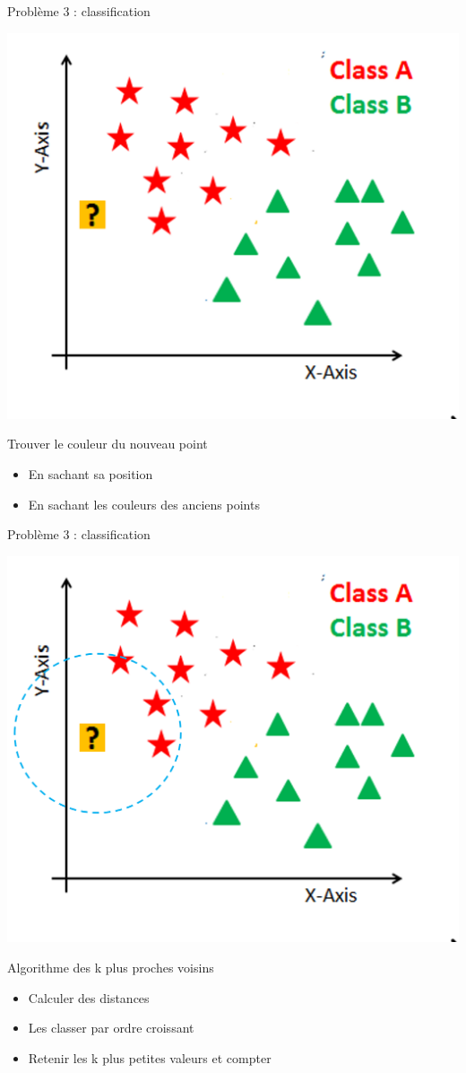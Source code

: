 \documentclass[10pt]{beamer}
\begin{document}
\begin{frame}{Problème 3 : classification} 
 \begin{center}
\includegraphics[height=0.4\textwidth]{figures/knn_question.png}
\end{center} 
 
\begin{block}{Trouver le couleur du nouveau point}
\small {\begin{itemize}
\item En sachant sa position
\item En sachant les couleurs des anciens points 
\end{itemize}}
\end{block} 

\end{frame}


\begin{frame}{Problème 3 : classification} 
 
\begin{center}
\includegraphics[height=0.4\textwidth]{figures/knn_solution1.png}
\end{center} 
 
\begin{block}{Algorithme des k plus proches voisins}
\small {\begin{itemize}
\item Calculer des distances 
\item Les classer par ordre croissant
\item Retenir les k plus petites valeurs et compter 
\end{itemize}}
\end{block} 
\end{frame}
\end{document}
